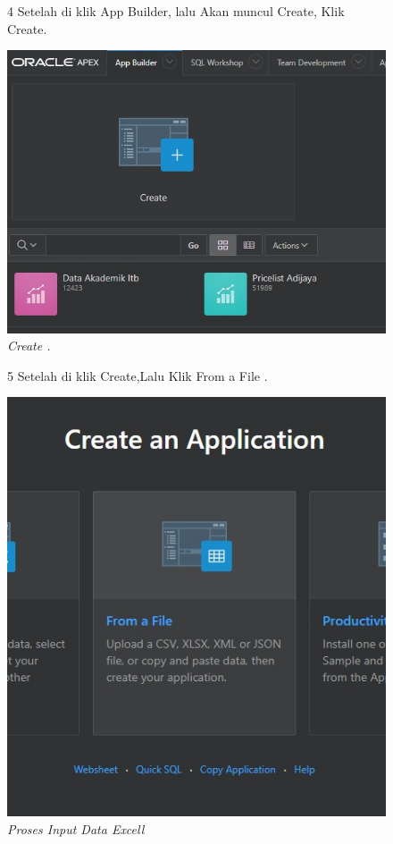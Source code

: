 \begin{enumerate}
\begin{figure}
\item[4] Setelah di klik App Builder, lalu Akan muncul Create, Klik Create.

    \begin{center}
\includegraphics[scale=0.4]{figures/4.jpg}
    \caption{\textit{Create .}}
        \end{center}
\label{gambar}
\end{figure}

\begin{figure}
\item[5] Setelah di klik Create,Lalu Klik From a File .

    \begin{center}
\includegraphics[scale=0.4]{figures/5.jpg}
    \caption{\textit{{Proses Input Data Excel}l}}
        \end{center}
\label{gambar}
\end{figure}


\end{enumerate}
